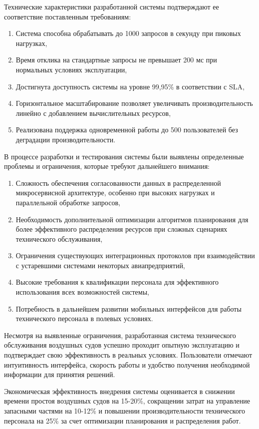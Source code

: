 \documentclass[14pt,a4paper]{extarticle}
\begin{document}
Технические характеристики разработанной системы подтверждают ее соответствие поставленным требованиям:

\begin{enumerate}
\item Система способна обрабатывать до 1000 запросов в секунду при пиковых нагрузках,
\item Время отклика на стандартные запросы не превышает 200 мс при нормальных условиях эксплуатации,
\item Достигнута доступность системы на уровне 99,95\% в соответствии с SLA,
\item Горизонтальное масштабирование позволяет увеличивать производительность линейно с добавлением вычислительных ресурсов,
\item Реализована поддержка одновременной работы до 500 пользователей без деградации производительности.
\end{enumerate}

В процессе разработки и тестирования системы были выявлены определенные проблемы и ограничения, которые требуют дальнейшего внимания:

\begin{enumerate}
\item Сложность обеспечения согласованности данных в распределенной микросервисной архитектуре, особенно при высоких нагрузках и параллельной обработке запросов,
\item Необходимость дополнительной оптимизации алгоритмов планирования для более эффективного распределения ресурсов при сложных сценариях технического обслуживания,
\item Ограничения существующих интеграционных протоколов при взаимодействии с устаревшими системами некоторых авиапредприятий,
\item Высокие требования к квалификации персонала для эффективного использования всех возможностей системы,
\item Потребность в дальнейшем развитии мобильных интерфейсов для работы технического персонала в полевых условиях.
\end{enumerate}

Несмотря на выявленные ограничения, разработанная система технического обслуживания воздушных судов успешно проходит опытную эксплуатацию и подтверждает свою эффективность в реальных условиях. Пользователи отмечают интуитивность интерфейса, скорость работы и удобство получения необходимой информации для принятия решений.

Экономическая эффективность внедрения системы оценивается в снижении времени простоя воздушных судов на 15-20\%, сокращении затрат на управление запасными частями на 10-12\% и повышении производительности технического персонала на 25\% за счет оптимизации планирования и распределения работ.
\end{document}
